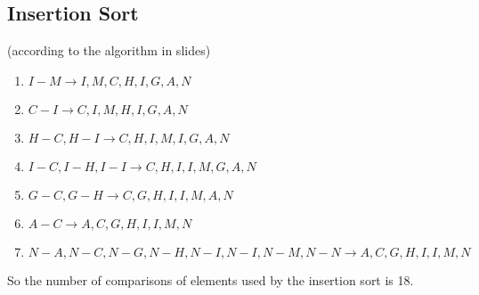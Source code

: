 \documentclass[a4paper,12pt,titlepage]{article}
\begin{document}
\subsection*{Insertion Sort}
(according to the algorithm in slides)
\begin{enumerate}
\item $I-M\rightarrow I,M,C,H,I,G,A,N$
\item $C-I\rightarrow C,I,M,H,I,G,A,N$
\item $H-C,H-I\rightarrow C,H,I,M,I,G,A,N$
\item $I-C,I-H,I-I\rightarrow C,H,I,I,M,G,A,N$
\item $G-C,G-H\rightarrow C,G,H,I,I,M,A,N$
\item $A-C\rightarrow A,C,G,H,I,I,M,N$
\item $N-A,N-C,N-G,N-H,N-I,N-I,N-M,N-N\rightarrow A,C,G,H,I,I,M,N$
\end{enumerate}
So the number of comparisons of elements used by the insertion sort is 18.
\end{document}
